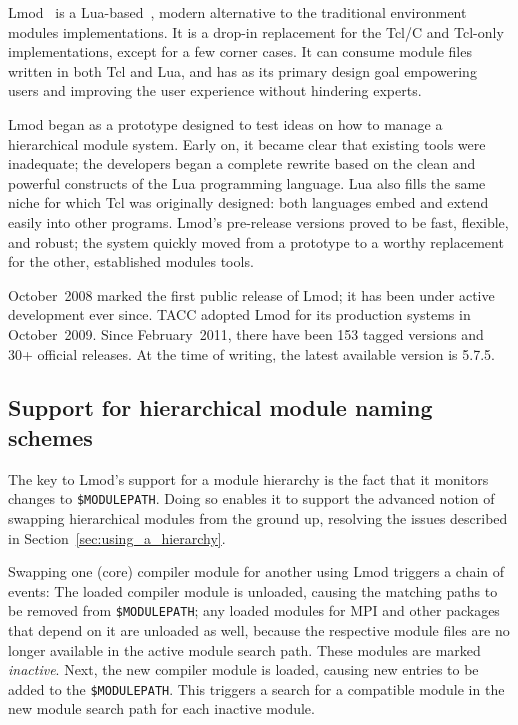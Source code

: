 Lmod~\cite{laytonLmod,taccSecretSauce,taccLmod} is a Lua-based~\cite{LuaBook},
modern alternative to the traditional environment modules implementations.
It is a drop-in replacement for the Tcl/C
and Tcl-only implementations, except for a few corner cases.
It can consume module files written in both Tcl and
Lua, and has as its primary design goal empowering users 
and improving the user experience without hindering experts.

Lmod began as a prototype designed to test ideas on how to manage a hierarchical
module system.  Early on, it became clear that existing tools were inadequate; 
the developers began a complete rewrite based on the clean
and powerful constructs of the Lua programming language.
Lua also fills the same niche for which Tcl was
originally designed: both languages embed and extend easily into
other programs.  Lmod's pre-release versions proved to be
fast, flexible, and robust; the system quickly moved from
a prototype to a worthy replacement for the other, established modules tools.

October~2008 marked the first public release of Lmod; it has been under active
development ever since. TACC adopted Lmod for its production systems in October~2009.
Since February~2011, there have been 153 tagged versions and 30+ official releases.
At the time of writing, the latest available version is 5.7.5.

\subsection{Support for hierarchical module naming schemes}

The key to Lmod's support for a module hierarchy is the fact that it monitors
changes to \texttt{\small \$MODULEPATH}. Doing so enables it to support the
advanced notion of swapping hierarchical modules from the ground up, resolving
the issues described in Section~\ref{sec:using_a_hierarchy}.

Swapping one (core) compiler module for another using Lmod triggers
a chain of events:  The loaded compiler module is unloaded, 
causing the matching paths to be removed from \texttt{\small \$MODULEPATH}; 
 any loaded modules for MPI and other packages that depend on it
are unloaded as well, because the respective module files are no longer available
in the active module search path. These modules are marked \emph{inactive}.
Next, the new compiler module is loaded, causing new entries
to be added to the \texttt{\small \$MODULEPATH}. This triggers a search
for a compatible module in the new module search path for each inactive module.

